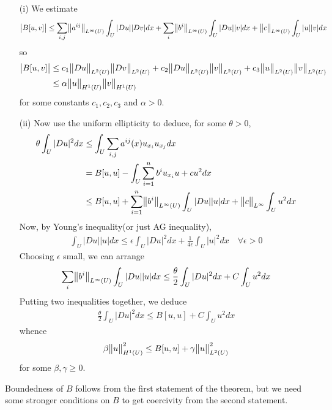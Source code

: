 \documentclass[10pt,a4paper]{report}
\newenvironment{proof}
{\begin{changemargin}{1cm}{0.5cm} 
	}%
	{\end{changemargin}
}
\begin{document}
\begin{proof}
\pf \begin{itemize}
\item[(i)] We estimate
\begin{align*}
\big| B[u,v]\big| \leq \sum_{i,j} \bigl\lVert a^{ij}\bigr\rVert_{L^{\infty}(U)} \int_U |Du||Dv| dx + \sum_{i} \bigl\lVert b^i\bigr\rVert_{L^{\infty}(U)} \int_U |Du||v| dx + \bigl\lVert c\bigr\rVert_{L^{\infty}(U)} \int_U |u||v| dx
\end{align*}
so
\begin{align*}
\big| B[u,v]\big| &\leq c_1 \bigl\lVert Du\bigr\rVert_{L^2(U)} \bigl\lVert Dv\bigr\rVert_{L^2(U)} + c_2 \bigl\lVert Du\bigr\rVert_{L^2(U)} \bigl\lVert v\bigr\rVert_{L^2(U)} + c_3 \bigl\lVert u\bigr\rVert_{L^2(U)} \bigl\lVert v\bigr\rVert_{L^2(U)} \\
&\leq \alpha \bigl\lVert u\bigr\rVert_{H^1(U)} \bigl\lVert v\bigr\rVert_{H^1(U)}
\end{align*}
for some constants $c_1,c_2,c_3$ and $\alpha>0$.
\item[(ii)] Now use the uniform ellipticity to deduce, for some $\theta >0$,
\begin{align*}
\theta \int_U |Du|^2 dx &\leq \int_U \sum_{i,j} a^{ij}(x) u_{x_i} u_{x_j} dx \\
&= B[u,u] - \int_U \sum_{i=1}^n b^i u_{x_i} u + cu^2 dx \\
&\leq B[u,u] + \sum_{i=1}^n \bigl\lVert b^i\bigr\rVert_{L^{\infty}(U)} \int_U |Du||u| dx + \bigl\lVert c\bigr\rVert_{L^{\infty}} \int_U u^2 dx
\end{align*}
Now, by Young's inequality(or just AG inequality),
\begin{align*}
\int_U |Du||u| dx \leq \epsilon \int_U |Du|^2 dx + \frac{1}{4\epsilon} \int_U |u|^2 dx \quad \forall \epsilon>0
\end{align*}
Choosing $\epsilon$ small, we can arrange
\begin{align*}
\sum_i \bigl\lVert b^i\bigr\rVert_{L^{\infty}(U)} \int_U |Du||u| dx \leq \frac{\theta}{2} \int_U |Du|^2 dx + C \int_U u^2 dx
\end{align*}
Putting two inequalities together, we deduce
\begin{align*}
\frac{\theta}{2} \int_U |Du|^2 dx \leq B[u,u] + C \int_U u^2 dx
\end{align*}
whence
\begin{align*}
\beta \bigl\lVert u\bigr\rVert_{H^1(U)}^2 \leq B[u,u] + \gamma \bigl\lVert u\bigr\rVert_{L^2(U)}^2
\end{align*}
for some $\beta, \gamma\geq 0$.
\end{itemize}

\eop
\end{proof}
\s

Boundedness of $B$ follows from the first statement of the theorem, but we need some stronger conditions on $B$ to get coercivity from the second statement.
\s
\end{document}
